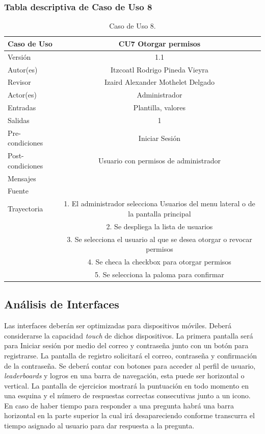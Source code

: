 \documentclass{article}
\begin{document}
\subsubsection{Tabla descriptiva de Caso de Uso 8}
\begin{table}[H]
\caption{Caso de Uso 8.}
\begin{tabular}{|M{5cm}|c|}

\hline
Caso de Uso & CU7 Otorgar permisos\\ \hline
Versión & 1.1\\ \hline
Autor(es) & Itzcoatl Rodrigo Pineda Vieyra \\ \hline
Revisor &  Izaird Alexander Mothelet Delgado \\ \hline
Actor(es) & Administrador \\ \hline
Entradas &  Plantilla, valores \\ \hline
Salidas & 1 \\ \hline
Pre-condiciones & Iniciar Sesión  \\ \hline
Post-condiciones & Usuario con permisos de administrador\\ \hline
Mensajes & \\
Fuente &  \\ \hline	
	Trayectoria
		& 1. El administrador selecciona Usuarios del menu lateral o de la pantalla principal \\
		& 2. Se despliega la lista de usuarios\\ 
		& 3. Se selecciona el usuario al que se desea otorgar o revocar permisos \\
		& 4. Se checa la checkbox para otorgar permisos\\
		& 5. Se selecciona la paloma para confirmar\\		
		\hline
\end{tabular}

\end{table}


\subsection{Análisis de Interfaces}
Las interfaces deberán ser optimizadas para dispositivos móviles. Deberá considerarse la capacidad \emph{touch} de dichos dispositivos. La primera pantalla será para Iniciar sesión por medio del correo y contraseña junto con un botón para registrarse. La pantalla de registro solicitará el correo, contraseña y confirmación de la contraseña. Se deberá contar con botones para acceder al perfil de usuario, \emph{leaderboards} y logros en una barra de navegación, esta puede ser horizontal o vertical. La pantalla de ejercicios mostrará la puntuación en todo momento en una esquina y el número de respuestas correctas consecutivas junto a un icono. En caso de haber tiempo para responder a una pregunta habrá una barra horizontal en la parte superior la cual irá desapareciendo conforme transcurra el tiempo asignado al usuario para dar respuesta a la pregunta.
\end{document}
